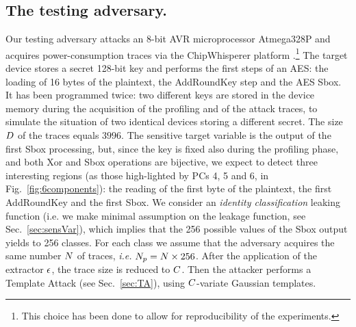 \subsection{The testing adversary.}  
Our testing adversary attacks an 8-bit AVR microprocessor Atmega328P and acquires power-consumption traces via the ChipWhisperer platform \cite{o2014chipwhisperer}.\footnote{This choice has been done to allow for reproducibility of the experiments.} The target device stores a secret 128-bit key and performs the first steps of an AES: the loading of 16 bytes of the plaintext, the AddRoundKey step and the AES Sbox. It has been programmed twice: two different keys are stored in the device memory during the acquisition of the profiling and of the attack traces, to simulate the situation of two identical devices storing a different secret. The size $D$ of the traces equals $3996$. The sensitive target  variable is the output of the first Sbox processing, but, since the key is fixed also during the profiling phase, and both Xor and Sbox operations are bijective, we expect to detect three interesting regions (as those high-lighted by PCs 4, 5 and 6, in Fig.~\ref{fig:6components}): the reading of the first byte of the plaintext, the first AddRoundKey and the first Sbox. We consider an {\em identity classification} leaking function (i.e. we make minimal assumption on the leakage function, see Sec.~\ref{sec:sensVar}), which implies that the 256 possible values of the Sbox output yields to 256 classes. For each class we assume that the adversary acquires the same number $N$ of traces, \textit{i.e.} $N_p =N\times 256$. After the application of the extractor $\epsilon$, the trace size is reduced to $C$. Then the attacker performs a Template Attack (see Sec.~\ref{sec:TA}), using $C$-variate Gaussian templates.


